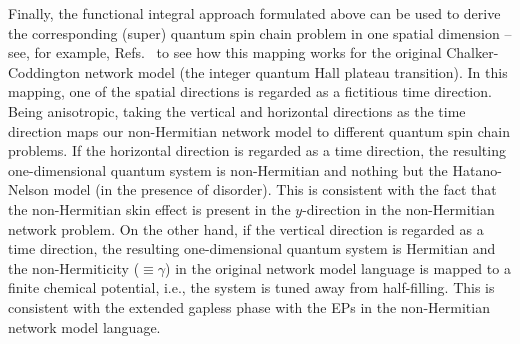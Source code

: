 \documentclass[aps,pra,reprint,superscriptaddress,showkeys,amsmath,amssymb,longbibliography]{revtex4-1}
\begin{document}
Finally, the functional integral approach formulated above can be used to derive the corresponding (super) quantum spin chain problem in one spatial dimension -- see, for example, Refs.\ \cite{PhysRevB.50.10788, 1996PMagL..73..145L, 1997NuPhB.497..639K} to see how this mapping works for the original Chalker-Coddington network model (the integer quantum Hall plateau transition).
In this mapping, one of the spatial directions is regarded as a fictitious time direction.
Being anisotropic, taking the vertical and horizontal directions as the time direction maps our non-Hermitian network model to different quantum spin chain problems. 
If the horizontal direction is regarded as a time direction, the resulting one-dimensional quantum system is non-Hermitian and nothing but the Hatano-Nelson model (in the presence of disorder).
This is consistent with the fact that the non-Hermitian skin effect is present in the $y$-direction in the non-Hermitian network problem.
On the other hand, if the vertical direction is regarded as a time direction, the resulting one-dimensional quantum system is Hermitian and the non-Hermiticity ($\equiv \gamma$) in the original network model language is mapped to a finite chemical potential, i.e., the system is tuned away from half-filling. 
This is consistent with the extended gapless phase with the EPs in the non-Hermitian network model language. 

\newpage


\end{document}
